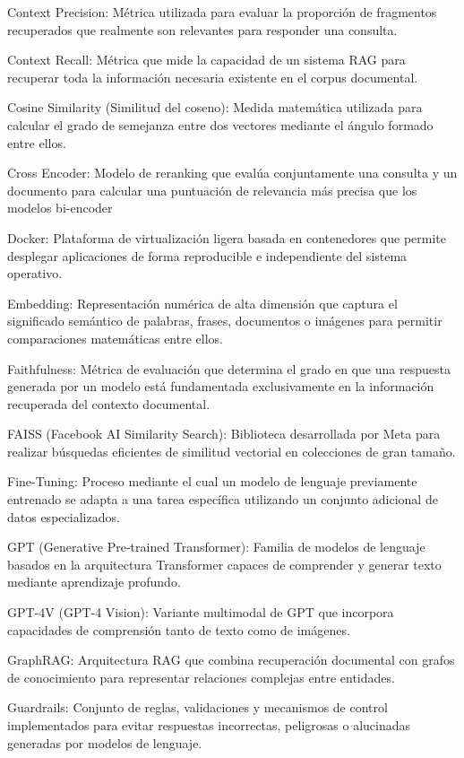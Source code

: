 Context Precision: Métrica utilizada para evaluar la proporción de fragmentos recuperados que realmente son relevantes para responder una consulta.

Context Recall: Métrica que mide la capacidad de un sistema RAG para recuperar toda la información necesaria existente en el corpus documental.

Cosine Similarity (Similitud del coseno): Medida matemática utilizada para calcular el grado de semejanza entre dos vectores mediante el ángulo formado entre ellos.

Cross Encoder: Modelo de reranking que evalúa conjuntamente una consulta y un documento para calcular una puntuación de relevancia más precisa que los modelos bi-encoder

Docker: Plataforma de virtualización ligera basada en contenedores que permite desplegar aplicaciones de forma reproducible e independiente del sistema operativo.

Embedding: Representación numérica de alta dimensión que captura el significado semántico de palabras, frases, documentos o imágenes para permitir comparaciones matemáticas entre ellos.

Faithfulness: Métrica de evaluación que determina el grado en que una respuesta generada por un modelo está fundamentada exclusivamente en la información recuperada del contexto documental.

FAISS (Facebook AI Similarity Search): Biblioteca desarrollada por Meta para realizar búsquedas eficientes de similitud vectorial en colecciones de gran tamaño.

Fine-Tuning: Proceso mediante el cual un modelo de lenguaje previamente entrenado se adapta a una tarea específica utilizando un conjunto adicional de datos especializados.

GPT (Generative Pre-trained Transformer): Familia de modelos de lenguaje basados en la arquitectura Transformer capaces de comprender y generar texto mediante aprendizaje profundo.

GPT-4V (GPT-4 Vision): Variante multimodal de GPT que incorpora capacidades de comprensión tanto de texto como de imágenes.

GraphRAG: Arquitectura RAG que combina recuperación documental con grafos de conocimiento para representar relaciones complejas entre entidades.

Guardrails: Conjunto de reglas, validaciones y mecanismos de control implementados para evitar respuestas incorrectas, peligrosas o alucinadas generadas por modelos de lenguaje.

